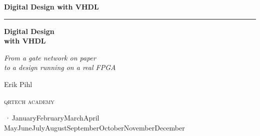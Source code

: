 %
\providecommand{\bookversion}{}
\newcommand{\bookdate}{\number\day\space\ifcase\month\or January\or February\or March\or April\or
  May\or June\or July\or August\or September\or October\or November\or December\fi\space
  \number\year}
\newcommand{\bookedition}{\ifx\bookversion\empty\else\bookversion\,·\,\fi\bookdate}

\thispagestyle{empty}
\vspace*{2.2in}
\begin{flushright}
  {\Large\bfseries Digital Design with VHDL}
\end{flushright}
\cleardoublepage

\thispagestyle{empty}
\vspace*{1.1in}
\begin{flushleft}
  {\color{accent}\rule{0.9in}{2.5pt}}\par\vspace{1.4ex}
  {\fontsize{32}{38}\selectfont\bfseries Digital Design\\[0.15ex] with VHDL\par}
  \vspace{2.2ex}
  {\Large\itshape From a gate network on paper\\to a design running on a real FPGA\par}
  \vspace{1.2in}
  {\large Erik Pihl\par}
  \vfill
  {\small\scshape\lsstyle qrtech academy\par}
  \vspace{0.6ex}
  {\small\color{muted} \bookedition\par}
\end{flushleft}
\newpage

